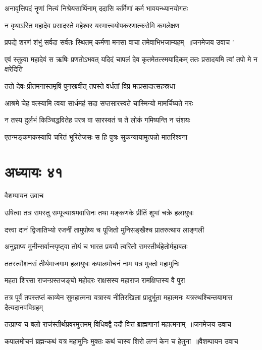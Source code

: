 \twolineshloka
{अनावृत्तिपदं नॄणां नित्यं निश्रेयसार्थिनाम्}
{ददासि कर्मिणां कर्म भावयन्ध्यानयोगतः}


\twolineshloka
{न वृथाऽस्ति महादेव प्रसादस्ते महेश्वर}
{यस्मात्त्वयोपकरणात्करोमि कमलेक्षण}


\threelineshloka
{प्रपद्ये शरणं शंभुं सर्वदा सर्वतः स्थितम्}
{कर्मणा मनसा वाचा तमेवाभिभजाम्यहम् ॥जनमेजय उवाच}
{'}


एवं स्तुत्वा महादेवं स ऋषिः प्रणतोऽभवत्
\twolineshloka
{यदिदं चापलं देव कृतमेतत्स्मयादिकम्}
{ततः प्रसादयमि त्वां तपो मे न क्षरेदिति}


\twolineshloka
{ततो देवः प्रीतमनास्तमृषिं पुनरब्रवीत्}
{तपस्ते वर्धतां विप्र मत्प्रसादात्सहस्रधा}


\twolineshloka
{आश्रमे चेह वत्स्यामि त्वया सार्धमहं सदा}
{सप्तसारस्वते चास्मिन्यो मामर्चिष्यते नरः}


\twolineshloka
{न तस्य दुर्लभं किञ्चिद्धवितेह परत्र वा}
{सारस्वतं च ते लोकं गमिष्यन्ति न संशयः}


\twolineshloka
{एतन्मङ्कणकस्यापि चरितं भूरितेजसः}
{स हि पुत्रः सुकन्यायामुत्पन्नो मातरिश्वना}


\chapter{अध्यायः ४१}
\twolineshloka
{वैशम्पायन उवाच}
{}


\twolineshloka
{उषित्वा तत्र रामस्तु सम्पूज्याश्रमवासिनः}
{तथा मङ्कणके प्रीतिं शुभां चक्रे हलायुधः}


\twolineshloka
{दत्त्वा दानं द्विजातिभ्यो रजनीं तामुपोष्य च}
{पूजितो मुनिसङ्खैश्च प्रातरुत्थाय लाङ्गली}


\twolineshloka
{अनुज्ञाप्य मुनीन्सर्वान्स्पृष्ट्वा तोयं च भारत}
{प्रययौ त्वरितो रामस्तीर्थहेतोर्महाबलः}


\twolineshloka
{ततस्त्वौशनसं तीर्थमाजगाम हलायुधः}
{कपालमोचनं नाम यत्र मुक्तो महामुनिः}


\twolineshloka
{महता शिरसा राजन्ग्रस्तजङ्घो महोदरः}
{राक्षसस्य महाराज रामक्षिप्तस्य वै पुरा}


\threelineshloka
{तत्र पूर्वं तपस्तप्तं काव्येन सुमहात्मना}
{यत्रास्य नीतिरखिला प्रादुर्भूता महात्मनः}
{यत्रस्थश्चिन्तयामास दैत्यदानवविग्रहम्}


\threelineshloka
{तत्प्राप्य च बलो राजंस्तीर्थप्रवरमुत्तमम्}
{विधिवद्वै ददौ वित्तं ब्राह्मणानां महात्मनाम् ॥जनमेजय उवाच}
{}


\threelineshloka
{कपालमोचनं ब्रह्मन्कथं यत्र महामुनिः}
{मुक्तः कथं चास्य शिरो लग्नं केन च हेतुना ॥वैशम्पायन उवाच}
{}


